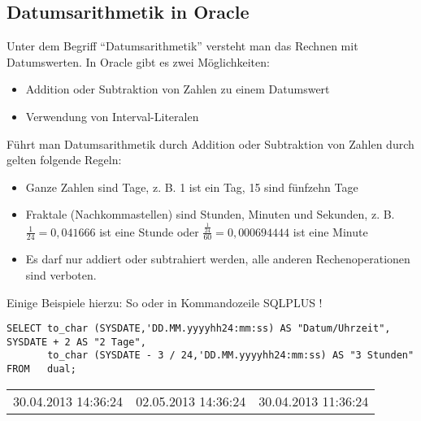       \subsection{Datumsarithmetik in Oracle}
        Unter dem Begriff \enquote{Datumsarithmetik} versteht man das Rechnen mit Datumswerten. In Oracle gibt es zwei Möglichkeiten:
        \begin{itemize}
          \item Addition oder Subtraktion von Zahlen zu einem Datumswert
          \item Verwendung von Interval-Literalen
        \end{itemize}
        Führt man Datumsarithmetik durch Addition oder Subtraktion von Zahlen durch gelten folgende Regeln:
        \begin{itemize}
          \item Ganze Zahlen sind Tage, z. B. 1 ist ein Tag, 15 sind fünfzehn Tage
          \item Fraktale (Nachkommastellen) sind Stunden, Minuten und Sekunden, z. B. $\frac{1}{24}=0,041666$ ist eine Stunde oder $\frac{\frac{1}{24}}{60}=0,000694444$ ist eine Minute
          \item Es darf nur addiert oder subtrahiert werden, alle anderen Rechenoperationen sind verboten.
        \end{itemize}
        Einige Beispiele hierzu: So oder in Kommandozeile SQLPLUS !
      
        \begin{lstlisting}[language=oracle_sql,caption={Einfache Datumsarithmetik in Oracle},label=sql03_19]
SELECT to_char (SYSDATE,'DD.MM.yyyyhh24:mm:ss) AS "Datum/Uhrzeit", SYSDATE + 2 AS "2 Tage",
       to_char (SYSDATE - 3 / 24,'DD.MM.yyyyhh24:mm:ss) AS "3 Stunden"
FROM   dual;
        \end{lstlisting}
        \begin{center}
          \begin{small}
            \tablehead{}
            \tabletail {
            }
            \begin{oraclesql}
              \begin{supertabular}{lll}
                30.04.2013 14:36:24 & 02.05.2013 14:36:24 & 30.04.2013 11:36:24 \\
              \end{supertabular}
            \end{oraclesql}
          \end{small}
        \end{center}
